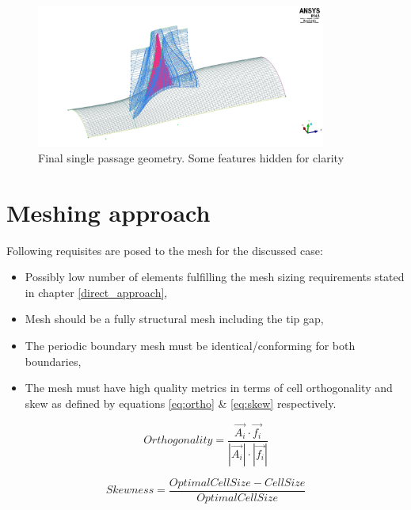 \begin{figure}[h!]
\centering %
\includegraphics[width=0.85\textwidth]{Pictures/r67_geom.jpg}
\caption{Final single passage geometry. Some features hidden for clarity}
\label{geom_final}
\end{figure}

\section{Meshing approach} \label{mesh}
Following requisites are posed to the mesh for the discussed case:
\begin{itemize}
\item Possibly low number of elements fulfilling the mesh sizing requirements stated in chapter \ref{direct_approach},
\item Mesh should be a fully structural mesh including the tip gap,
\item The periodic boundary mesh must be identical/conforming for both boundaries,
\item The mesh must have high quality metrics in terms of cell orthogonality and skew as defined by equations \ref{eq:ortho} \& \ref{eq:skew} respectively.
\end{itemize}


\begin{equation} \label{eq:ortho}
Orthogonality = \frac{\vec{A_i} \cdot \vec{f_i}}{|\vec{A_i}| \cdot |\vec{f_i}|}
\end{equation}


\begin{equation} \label{eq:skew}
Skewness = \frac{Optimal Cell Size - Cell Size}{Optimal Cell Size}
\end{equation}

